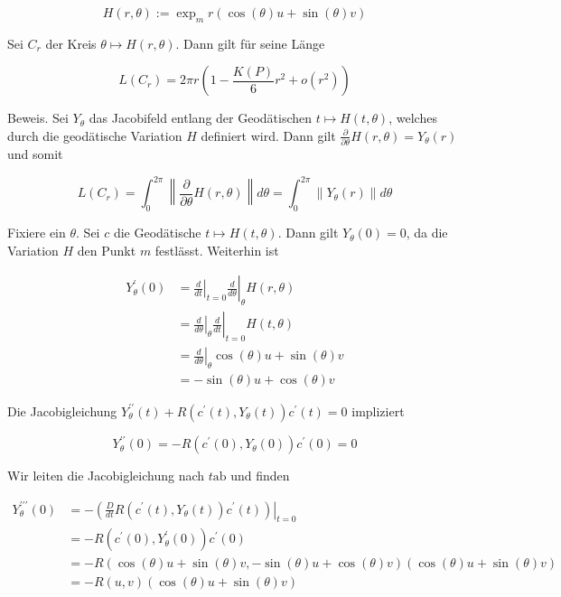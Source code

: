 \documentclass[10pt, letterpaper]{article}
\begin{document}
$$
H(r, \theta):=\exp _{m} r(\cos (\theta) u+\sin (\theta) v)
$$

Sei $C_{r}$ der Kreis $\theta \mapsto H(r, \theta)$. Dann gilt für seine Länge

$$
L\left(C_{r}\right)=2 \pi r\left(1-\frac{K(P)}{6} r^{2}+o\left(r^{2}\right)\right)
$$

Beweis. Sei $Y_{\theta}$ das Jacobifeld entlang der Geodätischen $t \mapsto H(t, \theta)$, welches durch die geodätische Variation $H$ definiert wird. Dann gilt $\frac{\partial}{\partial \theta} H(r, \theta)=Y_{\theta}(r)$ und somit

$$
L\left(C_{r}\right)=\int_{0}^{2 \pi}\left\|\frac{\partial}{\partial \theta} H(r, \theta)\right\| d \theta=\int_{0}^{2 \pi}\left\|Y_{\theta}(r)\right\| d \theta
$$

Fixiere ein $\theta$. Sei $c$ die Geodätische $t \mapsto H(t, \theta)$. Dann gilt $Y_{\theta}(0)=0$, da die Variation $H$ den Punkt $m$ festlässt. Weiterhin ist

$$
\begin{aligned}
Y_{\theta}^{\prime}(0) & =\left.\left.\frac{d}{d t}\right|_{t=0} \frac{d}{d \theta}\right|_{\theta} H(r, \theta) \\
& =\left.\left.\frac{d}{d \theta}\right|_{\theta} \frac{d}{d t}\right|_{t=0} H(t, \theta) \\
& =\left.\frac{d}{d \theta}\right|_{\theta} \cos (\theta) u+\sin (\theta) v \\
& =-\sin (\theta) u+\cos (\theta) v
\end{aligned}
$$

Die Jacobigleichung $Y_{\theta}^{\prime \prime}(t)+R\left(c^{\prime}(t), Y_{\theta}(t)\right) c^{\prime}(t)=0$ impliziert

$$
Y_{\theta}^{\prime \prime}(0)=-R\left(c^{\prime}(0), Y_{\theta}(0)\right) c^{\prime}(0)=0
$$

Wir leiten die Jacobigleichung nach $t \mathrm{ab}$ und finden

$$
\begin{aligned}
Y_{\theta}^{\prime \prime \prime}(0) & =-\left.\left(\frac{D}{d t} R\left(c^{\prime}(t), Y_{\theta}(t)\right) c^{\prime}(t)\right)\right|_{t=0} \\
& =-R\left(c^{\prime}(0), Y_{\theta}^{\prime}(0)\right) c^{\prime}(0) \\
& =-R(\cos (\theta) u+\sin (\theta) v,-\sin (\theta) u+\cos (\theta) v)(\cos (\theta) u+\sin (\theta) v) \\
& =-R(u, v)(\cos (\theta) u+\sin (\theta) v)
\end{aligned}
$$
\end{document}
